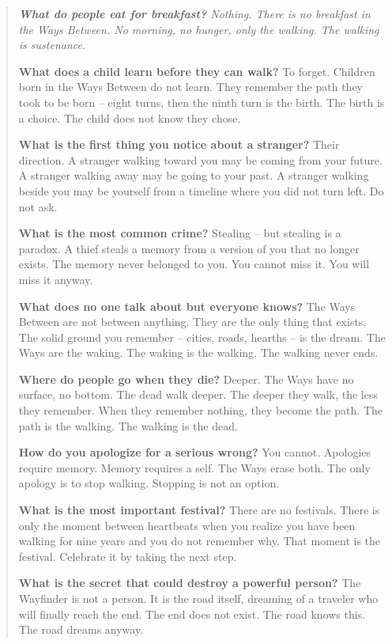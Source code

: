 \documentclass[12pt,oneside]{book}
\newenvironment{almanac}
  {\begin{quote}\small\itshape}
  {\end{quote}}
\begin{document}
\vspace{1em}
\begin{almanac}
\textbf{What do people eat for breakfast?} Nothing. There is no breakfast in the Ways Between. No morning, no hunger, only the walking. The walking is sustenance.

\textbf{What does a child learn before they can walk?} To forget. Children born in the Ways Between do not learn. They remember the path they took to be born -- eight turns, then the ninth turn is the birth. The birth is a choice. The child does not know they chose.

\textbf{What is the first thing you notice about a stranger?} Their direction. A stranger walking toward you may be coming from your future. A stranger walking away may be going to your past. A stranger walking beside you may be yourself from a timeline where you did not turn left. Do not ask.

\textbf{What is the most common crime?} Stealing -- but stealing is a paradox. A thief steals a memory from a version of you that no longer exists. The memory never belonged to you. You cannot miss it. You will miss it anyway.

\textbf{What does no one talk about but everyone knows?} The Ways Between are not between anything. They are the only thing that exists. The solid ground you remember -- cities, roads, hearths -- is the dream. The Ways are the waking. The waking is the walking. The walking never ends.

\textbf{Where do people go when they die?} Deeper. The Ways have no surface, no bottom. The dead walk deeper. The deeper they walk, the less they remember. When they remember nothing, they become the path. The path is the walking. The walking is the dead.

\textbf{How do you apologize for a serious wrong?} You cannot. Apologies require memory. Memory requires a self. The Ways erase both. The only apology is to stop walking. Stopping is not an option.

\textbf{What is the most important festival?} There are no festivals. There is only the moment between heartbeats when you realize you have been walking for nine years and you do not remember why. That moment is the festival. Celebrate it by taking the next step.

\textbf{What is the secret that could destroy a powerful person?} The Wayfinder is not a person. It is the road itself, dreaming of a traveler who will finally reach the end. The end does not exist. The road knows this. The road dreams anyway.
\end{almanac}
\end{document}
